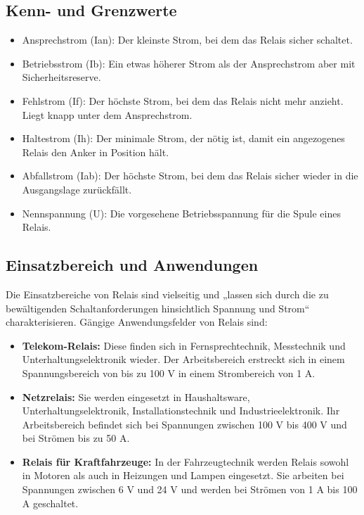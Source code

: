 \subsection*{Kenn- und Grenzwerte}
\begin{itemize}
	\item Ansprechstrom (Ian): Der kleinste Strom, bei dem das Relais sicher schaltet.
	\item Betriebsstrom (Ib): Ein etwas höherer Strom als der Ansprechstrom aber mit Sicherheitsreserve.
	\item Fehlstrom (If): Der höchste Strom, bei dem das Relais nicht mehr anzieht. Liegt knapp unter dem Ansprechstrom.
	\item Haltestrom (Ih): Der minimale Strom, der nötig ist, damit ein angezogenes Relais den Anker in Position hält.
	\item Abfallstrom (Iab): Der höchste Strom, bei dem das Relais sicher wieder in die Ausgangslage zurückfällt. 
	\item Nennspannung (U): Die vorgesehene Betriebsspannung für die Spule eines Relais.
\end{itemize}
\cite{ElektroKompendium:2025}

\subsection*{Einsatzbereich und Anwendungen}
Die Einsatzbereiche von Relais sind vielseitig und „lassen sich durch die zu bewältigenden Schaltanforderungen hinsichtlich Spannung und Strom“ charakterisieren. Gängige Anwendungsfelder von Relais sind: 
\begin{itemize}
	\item \textbf{Telekom-Relais:} Diese finden sich in Fernsprechtechnik, Messtechnik und Unterhaltungselektronik wieder. Der Arbeitsbereich erstreckt sich in einem Spannungsbereich von bis zu 100 V in einem Strombereich von 1 A.
	\item \textbf{Netzrelais:} Sie werden eingesetzt in Haushaltsware, Unterhaltungselektronik, Installationstechnik und Industrieelektronik. Ihr Arbeitsbereich befindet sich bei Spannungen zwischen 100 V bis 400 V und bei Strömen bis zu 50 A.
	\item \textbf{Relais für Kraftfahrzeuge:} In der Fahrzeugtechnik werden Relais sowohl in Motoren als auch in Heizungen und Lampen eingesetzt. Sie arbeiten bei Spannungen zwischen 6 V und 24 V und werden bei Strömen von 1 A bis 100 A geschaltet.
\end{itemize}
\cite{Schlaak:2006}

